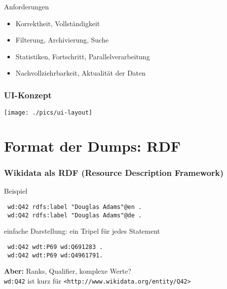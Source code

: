 \documentclass[aspectratio=1609,xcolor=usenames,dvipsnames,svgnames]{beamer}
\begin{document}


\begin{frame}{Anforderungen}
  \begin{itemize}
    \item Korrektheit, Vollständigkeit
    \item Filterung, Archivierung, Suche
    \item Statistiken, Fortschritt, Parallelverarbeitung
    \item Nachvollziehrbarkeit, Aktualität der Daten
  \end{itemize}
\end{frame}

\begin{frame}\frametitle{UI-Konzept}
  \centering
  \texttt{[image: ./pics/ui-layout]}
\end{frame}


\section{Format der Dumps: RDF}

\begin{frame}[t, fragile]\frametitle{Wikidata als RDF (Resource Description Framework)}
  \vspace{0.25cm}

  \begin{block}{Beispiel}
  \begin{verbatim}
 wd:Q42 rdfs:label "Douglas Adams"@en .
 wd:Q42 rdfs:label "Douglas Adams"@de .
  \end{verbatim}
  \end{block}

  \begin{block}{einfache Darstellung: ein Tripel für jedes Statement}
  \begin{verbatim}
 wd:Q42 wdt:P69 wd:Q691283 .
 wd:Q42 wdt:P69 wd:Q4961791.
  \end{verbatim}
  \end{block}

  \textbf{Aber:} Ranks, Qualifier, komplexe Werte? \\
  \vspace{0.5cm}
  \footnotesize{\verb|wd:Q42| ist kurz für \verb|<http://www.wikidata.org/entity/Q42>|}
\end{frame}
\end{document}
